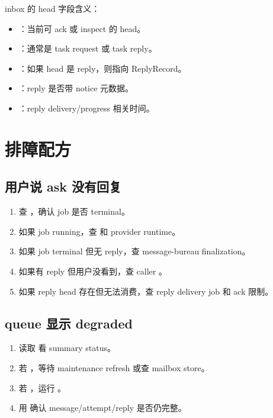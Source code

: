 inbox 的 head 字段含义：

\begin{itemize}
  \item {}：当前可 ack 或 inspect 的 head。
  \item {}：通常是 task request 或 task reply。
  \item {}：如果 head 是 reply，则指向 ReplyRecord。
  \item {}：reply 是否带 notice 元数据。
  \item {}：reply delivery/progress 相关时间。
\end{itemize}

\section{排障配方}

\subsection{用户说 ask 没有回复}

\begin{enumerate}
  \item 查 ，确认 job 是否 terminal。
  \item 如果 job running，查  和 provider runtime。
  \item 如果 job terminal 但无 reply，查 message-bureau finalization。
  \item 如果有 reply 但用户没看到，查 caller 。
  \item 如果 reply head 存在但无法消费，查 reply delivery job 和 ack 限制。
\end{enumerate}

\subsection{queue 显示 degraded}

\begin{enumerate}
  \item 读取  看 summary status。
  \item 若 ，等待 maintenance refresh 或查 mailbox store。
  \item 若 ，运行 。
  \item 用  确认 message/attempt/reply 是否仍完整。
\end{enumerate}

